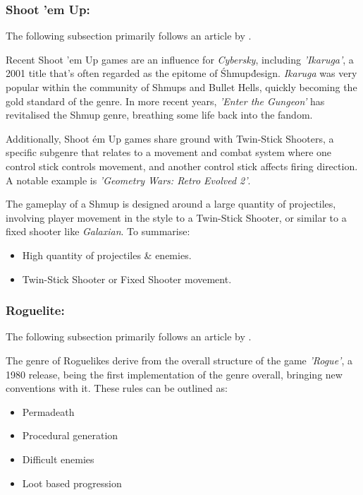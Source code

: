 \documentclass{scrartcl}
\let\cite\textcite
\begin{document}
\subsubsection{Shoot 'em Up:}

The following subsection primarily follows an article by \cite{BrianW2020-01}.

Recent Shoot 'em Up games are an influence for \emph{Cybersky}, including \emph{'Ikaruga'}, a 2001 title that's often regarded as the epitome of \'Shmup\' design. \emph{Ikaruga} was very popular within the community of Shmups and Bullet Hells, quickly becoming the gold standard of the genre. In more recent years, \emph{'Enter the Gungeon'} has revitalised the Shmup genre, breathing some life back into the fandom.

Additionally, Shoot \'em Up games share ground with Twin-Stick Shooters, a specific subgenre that relates to a movement and combat system where one control stick controls movement, and another control stick affects firing direction. A notable example is \emph{'Geometry Wars: Retro Evolved 2'}.

The gameplay of a Shmup is designed around a large quantity of projectiles, involving player movement in the style to a Twin-Stick Shooter, or similar to a fixed shooter like \emph{Galaxian}. To summarise:

\begin{itemize}
  \item High quantity of projectiles \& enemies.
  \item Twin-Stick Shooter or Fixed Shooter movement.
\end{itemize}

\subsubsection{Roguelite:}

The following subsection primarily follows an article by \cite{BrianW2020-02}.

The genre of Roguelikes derive from the overall structure of the game \emph{'Rogue'}, a 1980 release, being the first implementation of the genre overall, bringing new conventions with it. These rules can be outlined as:

\begin{itemize}
  \item Permadeath
  \item Procedural generation
  \item Difficult enemies
  \item Loot based progression
\end{itemize}
\end{document}
